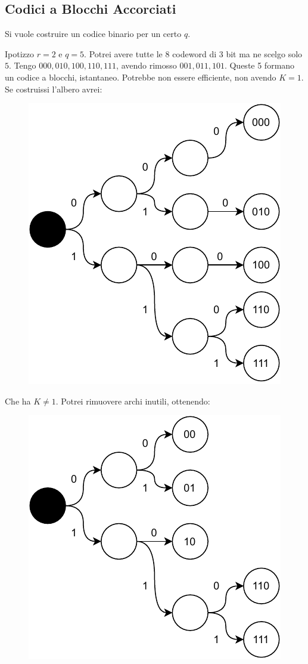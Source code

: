 \documentclass[a4paper,12pt, oneside]{book}
\begin{document}
\subsection{Codici a Blocchi Accorciati}
Si vuole costruire un codice binario per un certo $q$.
\begin{esempio}
  Ipotizzo $r=2$ e
  $q=5$. Potrei avere tutte le 8 codeword di 3 bit ma ne scelgo solo $5$. Tengo
  $000,010,100,110,111$, avendo rimosso $001,011,101$. Queste 5 formano un
  codice a blocchi, istantaneo. Potrebbe non essere efficiente, non avendo
  $K=1$. Se costruissi l'albero avrei:
  \begin{figure}[H]
    \centering
    \includegraphics[scale = 0.7]{img/b.pdf}
  \end{figure}
  Che ha $K\neq 1$.
  \newpage
  Potrei rimuovere archi inutili, ottenendo:
  \begin{figure}[H]
    \centering
    \includegraphics[scale = 0.7]{img/b2.pdf}

\end{figure}
\end{esempio}
\end{document}
